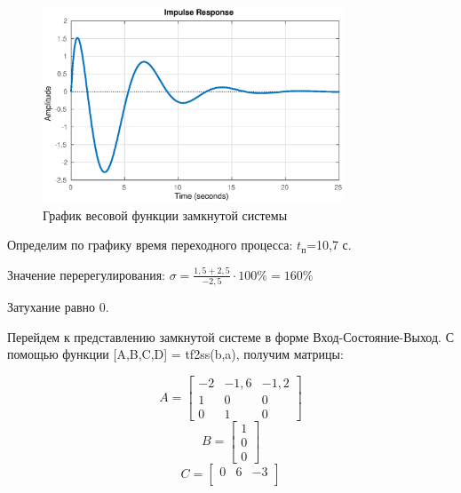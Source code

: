 \documentclass[12pt, a4paper]{article}
\begin{document}
\begin{figure}[H]
\centering
\includegraphics[width=0.8\textwidth]{1/impulse.eps}
\caption{График весовой функции замкнутой системы}
\end{figure}
 \par Определим по графику время переходного процесса: $t_\text{п}$=10,7 с. 
 \par Значение перерегулирования: $\sigma=\displaystyle{\frac{1,5+2,5}{-2,5}\cdot100\%=160\%}$
 \par Затухание равно 0.
 \par Перейдем к представлению замкнутой системе в форме Вход-Состояние-Выход. С помощью функции [A,B,C,D] = tf2ss(b,a), получим матрицы:
 
\begin{equation*}
A =\begin{bmatrix}
    -2      &   -1,6   &   -1,2 \\
    1       &   0   &	0 \\
    0    & 1  &   0
\end{bmatrix}
\end{equation*}
\begin{equation*}
B =\begin{bmatrix}
    1 \\
	0  \\
	0
\end{bmatrix}
\end{equation*}
\begin{equation*}
C =\begin{bmatrix}
    0 & 6  & -3 \\
\end{bmatrix}
\end{equation*}
\end{document}
